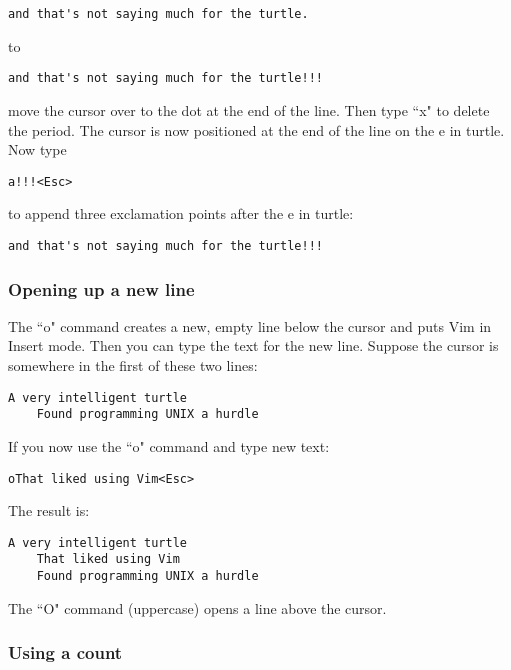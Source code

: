 		\begin{Verbatim}[samepage=true]
    and that's not saying much for the turtle.
		\end{Verbatim}
to
		\begin{Verbatim}[samepage=true]
    and that's not saying much for the turtle!!!
		\end{Verbatim}

move the cursor over to the dot at the end of the line. Then type ``x" to delete the period.
The cursor is now positioned at the end of the line on the e in turtle.
Now type

	\begin{Verbatim}[samepage=true]
	a!!!<Esc>
	\end{Verbatim}

to append three exclamation points after the e in turtle:

	\begin{Verbatim}[samepage=true]
	and that's not saying much for the turtle!!!
	\end{Verbatim}

\subsubsection{Opening up a new line}

The ``o" command creates a new, empty line below the cursor and puts Vim in Insert mode.
Then you can type the text for the new line.
Suppose the cursor is somewhere in the first of these two lines:

		\begin{Verbatim}[samepage=true]
    A very intelligent turtle
    Found programming UNIX a hurdle
		\end{Verbatim}

If you now use the ``o" command and type new text:

		\begin{Verbatim}[samepage=true]
		oThat liked using Vim<Esc>
		\end{Verbatim}

The result is:

		\begin{Verbatim}[samepage=true]
    A very intelligent turtle
    That liked using Vim
    Found programming UNIX a hurdle
		\end{Verbatim}

The ``O" command (uppercase) opens a line above the cursor.

\subsubsection{Using a count}

